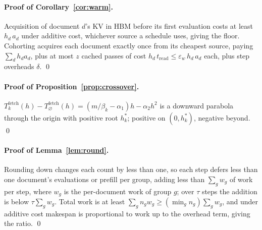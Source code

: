 \documentclass[10pt,twocolumn]{article}
\newcommand{\none}{\varnothing}
\newcommand{\eps}{\varepsilon}
\begin{document}
\paragraph{Proof of Corollary~\ref{cor:warm}.}
Acquisition of document $d$'s KV in HBM before its first evaluation costs at least $h_d\, a_d$ under additive cost, whichever source a schedule uses, giving the floor. Cohorting acquires each document exactly once from its cheapest source, paying $\sum_d h_d a_d$, plus at most $z$ cached passes of cost $h_d\, t_{\mathrm{read}} \le \eps_w\, h_d\, a_d$ each, plus step overheads $\delta$. \qed

\paragraph{Proof of Proposition~\ref{prop:crossover}.}
$T^{\mathrm{fetch}}_k(h) - T^{\mathrm{fetch}}_{\none}(h) = (m/\beta_k - \alpha_1)h - \alpha_2 h^2$ is a downward parabola through the origin with positive root $h^{\ast}_k$; positive on $(0, h^{\ast}_k)$, negative beyond. \qed

\paragraph{Proof of Lemma~\ref{lem:round}.}
Rounding down changes each count by less than one, so each step defers less than one document's evaluations or prefill per group, adding less than $\sum_g w_g$ of work per step, where $w_g$ is the per-document work of group $g$; over $\tau$ steps the addition is below $\tau \sum_g w_g$. Total work is at least $\sum_g n_g w_g \ge (\min_g n_g) \sum_g w_g$, and under additive cost makespan is proportional to work up to the overhead term, giving the ratio. \qed
\end{document}
